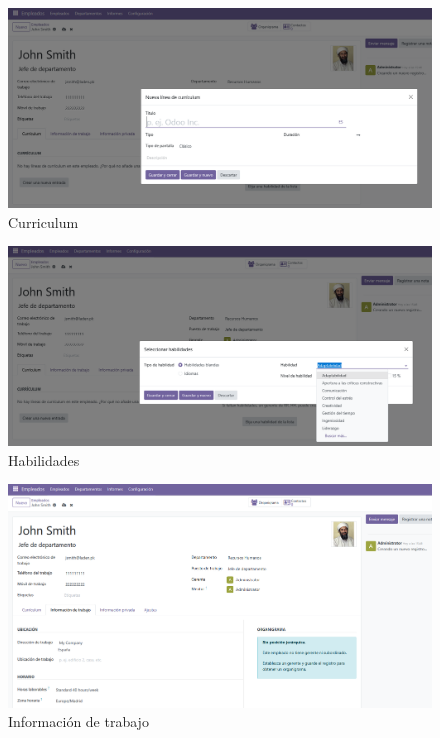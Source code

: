 \documentclass[a4paper,12pt]{article}
\begin{document}
\begin{figure}[h!]
    \centering
    \includegraphics[width=1\textwidth]{pr2odoo13-curriculum.png}
    \caption{Curriculum}
\end{figure}
\FloatBarrier

\begin{figure}[h!]
    \centering
    \includegraphics[width=1\textwidth]{pr2odoo14-habilidades.png}
    \caption{Habilidades}
\end{figure}
\FloatBarrier

\begin{figure}[h!]
    \centering
    \includegraphics[width=1\textwidth]{pr2odoo15-informacionDeTrabajo.png}
    \caption{Información de trabajo}
\end{figure}
\FloatBarrier
\end{document}
